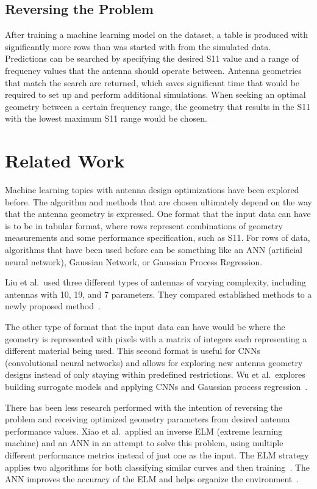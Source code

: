\documentclass[lettersize,journal]{IEEEtran}
\begin{document}
\subsection{Reversing the Problem}
After training a machine learning model on the dataset, a table is produced with significantly more rows than was started with from the simulated data. Predictions can be searched by specifying the desired S11 value and a range of frequency values that the antenna should operate between. Antenna geometries that match the search are returned, which saves significant time that would be required to set up and perform additional simulations. When seeking an optimal geometry between a certain frequency range, the geometry that results in the S11 with the lowest maximum S11 range would be chosen.


\section{Related Work}
Machine learning topics with antenna design optimizations have been explored before. The algorithm and methods that are chosen ultimately depend on the way that the antenna geometry is expressed. One format that the input data can have is to be in tabular format, where rows represent combinations of geometry measurements and some performance specification, such as S11. For rows of data, algorithms that have been used before can be something like an ANN (artificial neural network), Gaussian Network, or Gaussian Process Regression. 

Liu et al.~used three different types of antennas of varying complexity, including antennas with 10, 19, and 7 parameters. They compared established methods to a newly proposed method~\cite{liu_efficient_2014}.

The other type of format that the input data can have would be where the geometry is represented with pixels with a matrix of integers each representing a different material being used. This second format is useful for CNNs (convolutional neural networks) and allows for exploring new antenna geometry designs instead of only staying within predefined restrictions. Wu et al.~explores building surrogate models and applying CNNs and Gaussian process regression~\cite{wu_machine_2023}.

There has been less research performed with the intention of reversing the problem and receiving optimized geometry parameters from desired antenna performance values. Xiao et al.~applied an inverse ELM (extreme learning machine) and an ANN in an attempt to solve this problem, using multiple different performance metrics instead of just one as the input. The ELM strategy applies two algorithms for both classifying similar curves and then training~\cite{9063448}. The ANN improves the accuracy of the ELM and helps organize the environment~\cite{XiaoLi-Ye2021IANN}.
\end{document}
